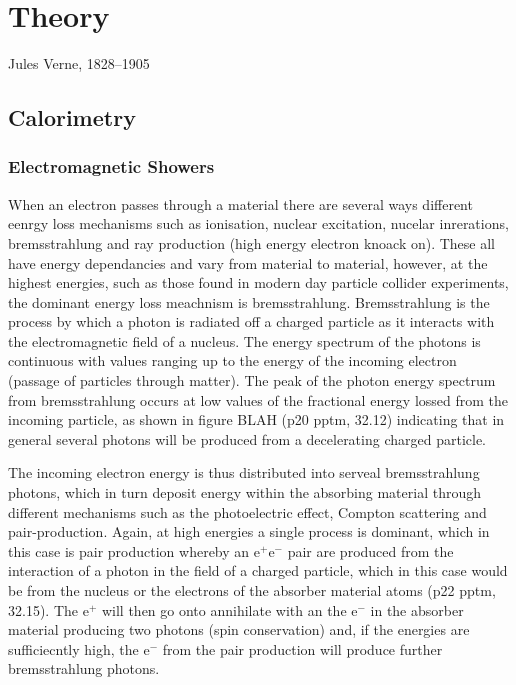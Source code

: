 \chapter{Theory}
\label{chap:theory}

{Jules Verne, 1828--1905}

\section{Calorimetry}

\subsection{Electromagnetic Showers}
When an electron passes through a material there are several ways different eenrgy loss mechanisms such as ionisation, nuclear excitation, nucelar inrerations, bremsstrahlung and \delta ray production (high energy electron knoack on).  These all have energy dependancies and vary from material to material, however, at the highest energies, such as those found in modern day particle collider experiments, the dominant energy loss meachnism is bremsstrahlung.  Bremsstrahlung is the process by which a photon is radiated off a charged particle as it interacts with the electromagnetic field of a nucleus.  The energy spectrum of the photons is continuous with values ranging up to the energy of the incoming electron (passage of particles through matter).  The peak of the photon energy spectrum from bremsstrahlung occurs at low values of the fractional energy lossed from the incoming particle, as shown in figure BLAH (p20 pptm, 32.12) indicating that in general several photons will be produced from a decelerating charged particle.  

The incoming electron energy is thus distributed into serveal bremsstrahlung photons, which in turn deposit energy within the absorbing material through different mechanisms such as the photoelectric effect, Compton scattering and pair-production.  Again, at high energies a single process is dominant, which in this case is pair production whereby an $\text{e}^{+}\text{e}^{-}$ pair are produced from the interaction of a photon in the field of a charged particle, which in this case would be from the nucleus or the electrons of the absorber material atoms (p22 pptm, 32.15).  The $\text{e}^{+}$ will then go onto annihilate with an the $\text{e}^{-}$ in the absorber material producing two photons (spin conservation) and, if the energies are sufficiecntly high, the $\text{e}^{-}$ from the pair production will produce further bremsstrahlung photons.  


